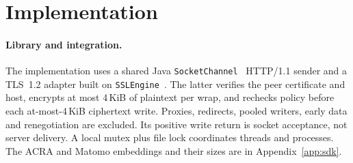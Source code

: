 \section{Implementation}
\label{sec:impl}

\paragraph{Library and integration.} The implementation uses a shared Java
\texttt{SocketChannel}~\cite{android_socketchannel} HTTP/1.1 sender and a TLS~1.2 adapter built on \texttt{SSLEngine}~\cite{java_sslengine}. The latter verifies the peer certificate and host, encrypts at most 4\,KiB of plaintext per wrap, and rechecks policy before each at-most-4\,KiB ciphertext write. Proxies, redirects, pooled writers, early data and renegotiation are excluded. Its positive write return is socket acceptance, not server delivery. A local
mutex plus file lock coordinates threads and processes. The ACRA and Matomo embeddings and their sizes are in
Appendix~\ref{app:sdk}.

